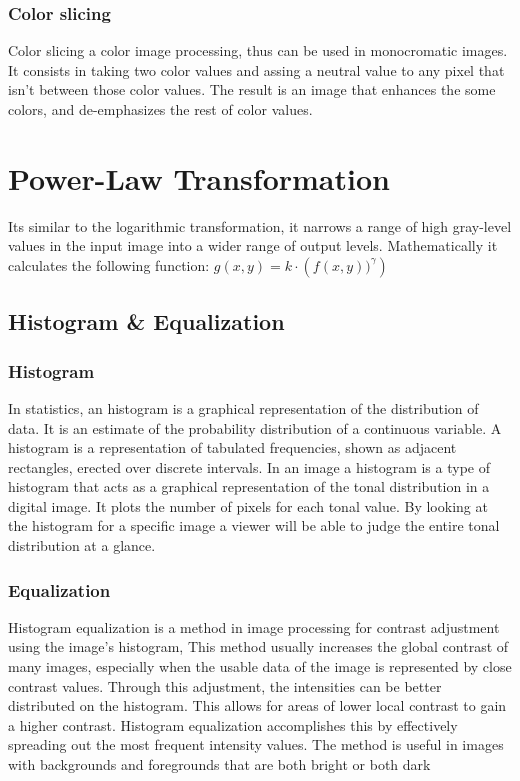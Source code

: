 \documentclass[a4paper]{article}
\begin{document}
\subsubsection{Color slicing}

Color slicing a color image processing, thus can be used in monocromatic images. It consists in taking two color values and assing a neutral value to any pixel that isn't between those color values. The result is an image that enhances the some colors, and de-emphasizes the rest of color values. 


\section{Power-Law Transformation}

Its similar to the logarithmic transformation, it narrows a range of high gray-level values in the input image into a wider range of output levels. Mathematically it calculates the following function:
\begin{math}
g(x,y) = k \cdot \left( f(x,y) )^{\gamma} \right)
\end{math}



\subsection{Histogram \& Equalization }
\subsubsection{Histogram}

In statistics, an histogram is a graphical representation of the distribution of data. It is an estimate of the probability distribution of a continuous variable. A histogram is a representation of tabulated frequencies, shown as adjacent rectangles, erected over discrete intervals. In an image a histogram is a type of histogram that acts as a graphical representation of the tonal distribution in a digital image. It plots the number of pixels for each tonal value. By looking at the histogram for a specific image a viewer will be able to judge the entire tonal distribution at a glance.

\subsubsection{Equalization}

Histogram equalization is a method in image processing for contrast adjustment using the image's histogram, This method usually increases the global contrast of many images, especially when the usable data of the image is represented by close contrast values. Through this adjustment, the intensities can be better distributed on the histogram. This allows for areas of lower local contrast to gain a higher contrast. Histogram equalization accomplishes this by effectively spreading out the most frequent intensity values. The method is useful in images with backgrounds and foregrounds that are both bright or both dark
\end{document}
